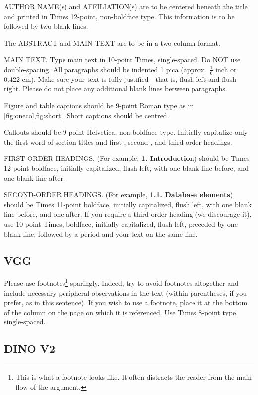 AUTHOR NAME(s) and AFFILIATION(s) are to be centered beneath the title
and printed in Times 12-point, non-boldface type.
This information is to be followed by two blank lines.

The ABSTRACT and MAIN TEXT are to be in a two-column format.

MAIN TEXT.
Type main text in 10-point Times, single-spaced.
Do NOT use double-spacing.
All paragraphs should be indented 1 pica (approx.~$\frac{1}{6}$ inch or 0.422 cm).
Make sure your text is fully justified---that is, flush left and flush right.
Please do not place any additional blank lines between paragraphs.

Figure and table captions should be 9-point Roman type as in \cref{fig:onecol,fig:short}.
Short captions should be centred.

\noindent Callouts should be 9-point Helvetica, non-boldface type.
Initially capitalize only the first word of section titles and first-, second-, and third-order headings.

FIRST-ORDER HEADINGS.
(For example, {\large \bf 1. Introduction}) should be Times 12-point boldface, initially capitalized, flush left, with one blank line before, and one blank line after.

SECOND-ORDER HEADINGS.
(For example, { \bf 1.1. Database elements}) should be Times 11-point boldface, initially capitalized, flush left, with one blank line before, and one after.
If you require a third-order heading (we discourage it), use 10-point Times, boldface, initially capitalized, flush left, preceded by one blank line, followed by a period and your text on the same line.

\subsection{VGG}

Please use footnotes\footnote{This is what a footnote looks like.
It often distracts the reader from the main flow of the argument.} sparingly.
Indeed, try to avoid footnotes altogether and include necessary peripheral observations in the text (within parentheses, if you prefer, as in this sentence).
If you wish to use a footnote, place it at the bottom of the column on the page on which it is referenced.
Use Times 8-point type, single-spaced.


\subsection{DINO V2}

